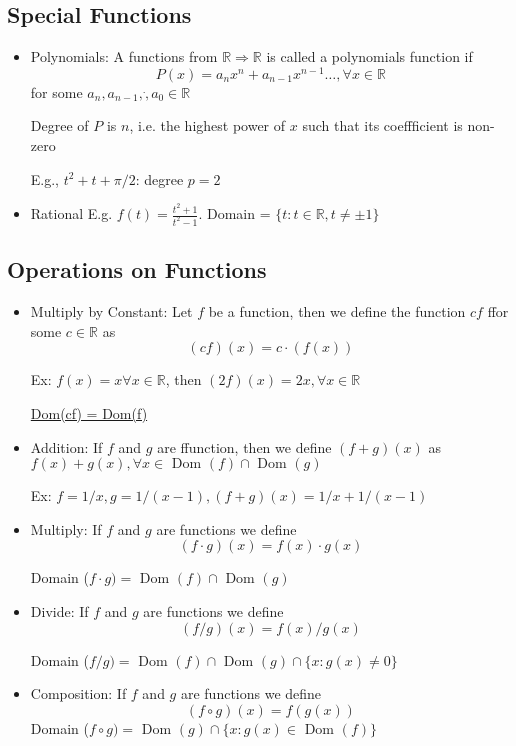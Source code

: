 \documentclass{report}
\begin{document}
    \subsection{Special Functions}%
    \begin{itemize}
      \item Polynomials: A functions from $\mathbb{R} \Rightarrow \mathbb{R}$
        is called a polynomials function if 
        \[P(x) = a_nx^n + a_{n-1}x^{n-1} \dots, \forall x \in \mathbb{R}\]
        for some $a_n, a_{n-1}, \dot, a_0 \in \mathbb{R}$

        Degree of $P$ is $n$, i.e. the highest power of $x$ such that its
        coeffficient is non-zero

        E.g., $t^2 + t + \pi/2$: degree $p=2$
      \item Rational 
        E.g. $f(t) = \frac{t^2+1}{t^2-1} $.  Domain = $\{t: t \in
        \mathbb{R}, t \neq \pm 1\}$
        
    \end{itemize}
    \subsection{Operations on Functions}%
    \begin{itemize}
      \item Multiply by Constant:  Let $f$ be a function, then we define
        the function $cf$ ffor some $ c\in \mathbb{R}$ as
        \[ (cf)(x) = c \cdot(f(x)) \]

        Ex: $f(x) = x \forall x \in \mathbb{R}$, then
        $(2f)(x) = 2x, \forall x \in \mathbb{R}$

        \underline{Dom(cf) = Dom(f)}
      \item Addition: If $f$ and $g$ are ffunction, then we define
        $(f + g)(x)$ as $f(x) + g(x), \forall x \in \text{ Dom }(f)
        \cap \text{ Dom }(g)$

        Ex: $f = 1/x, g = 1/(x-1), (f+g)(x) = 1/x + 1/(x-1)$

      \item Multiply: If $f$ and $g$ are functions we define
          \[ (f \cdot g)(x) = f(x) \cdot g(x) \]

          Domain ($f \cdot g) = \text{ Dom }(f) \cap \text{ Dom }(g)$

      \item Divide: If $f$ and $g$ are functions we define
          \[ (f / g)(x) = f(x) / g(x) \]

          Domain ($f / g) = \text{ Dom }(f) \cap \text{ Dom }(g)
          \cap \{x: g(x) \neq 0 \}$

      \item Composition: If $f$ and $g$ are functions we define
          \[ (f \circ g)(x) = f(g(x)) \]
          Domain ($f \circ g) = \text{ Dom }(g) \cap \{x: g(x) \in
          \text{ Dom }(f) \}$
    \end{itemize}
\end{document}
